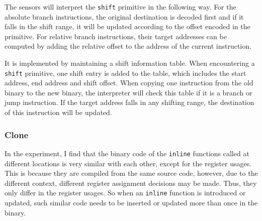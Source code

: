 The sensors will interpret the {\tt shift} primitive in the following way. 
For the absolute branch instructions, the original destination is decoded
first and if it falls in the shift range, it will be updated according
to the offset encoded in the primitive.
For relative branch instructions, their target addresses can be computed by adding the relative offset to the address of the current instruction.

It is implemented by maintaining a shift information table. When encountering a {\tt shift} primitive,
one shift entry is added to the table, which includes the start address, end address and shift offset.
When copying one instruction from the old binary to the new binary, the interpreter will check this table if it is a branch or jump instruction. If the target address falls in any shifting range, the destination of this instruction will be updated.
%        

\subsubsection {Clone}
In the experiment, I find that the binary code of the {\tt inline} functions called at different locations is very similar with each other, except for the register usages. This is because they are compiled from the same source code, however, due to the different context, different register assignment decisions may be made. Thus, they only differ in the register usages.
So when an {\tt inline} function is introduced or updated, such similar code needs to be inserted or updated more than once in the binary.

